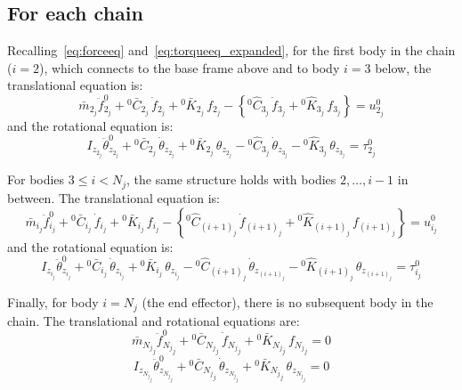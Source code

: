 \subsection{For each chain}

Recalling~\eqref{eq:forceeq} and~\eqref{eq:torqueeq_expanded}, for the first body in the chain ($i=2$), which connects to the base frame above and to body $i=3$ below, the translational equation is:
\begin{equation}
        \bar{m}_{2_j}
        \ddot{f}^{0}_{2_j}
        + {}^0\bar{C}_{2_j}\,\dot{f}_{2_j}
        + {}^0\bar{K}_{2_j}\,f_{2_j}
        - \left\{
            {}^0\hat{C}_{3_j}\,\dot{f}_{3_j} + {}^0\hat{K}_{3_j}\,f_{3_j}
        \right\}
        = u^0_{2_j}
\end{equation}
and the rotational equation is:
\begin{equation}
        I_{z_{2_j}}\ddot{\theta}^{0}_{z_{2_j}}
        + {}^0\bar{C}_{2_j}\,\dot{\theta}_{z_{2_j}}
        + {}^0\bar{K}_{2_j}\,\theta_{z_{2_j}}
        - {}^0\hat{C}_{3_j}\,\dot{\theta}_{z_{3_j}}
        - {}^0\hat{K}_{3_j}\,\theta_{z_{3_j}}
        = \tau^0_{2_j}
\end{equation}

For bodies $3\leq i< N_j$, the same structure holds with bodies $2, \dots, i-1$ in between. The translational equation is:
\begin{equation}
        \bar{m}_{i_j}
        \ddot{f}^{0}_{i_j}
        + {}^0\bar{C}_{i_j}\,\dot{f}_{i_j}
        + {}^0\bar{K}_{i_j}\,f_{i_j}
        -
        \left\{
            {}^0\hat{C}_{(i+1)_j}\,\dot{f}_{(i+1)_j} + {}^0\hat{K}_{(i+1)_j}\,f_{(i+1)_j}
        \right\}
        = u^0_{i_j}
\end{equation}
and the rotational equation is:
\begin{equation}
        I_{z_{i_j}}\ddot{\theta}^{0}_{z_{i_j}}
        + {}^0\bar{C}_{i_j}\,\dot{\theta}_{z_{i_j}}
        + {}^0\bar{K}_{i_j}\,\theta_{z_{i_j}}
        - {}^0\hat{C}_{(i+1)_j}\,\dot{\theta}_{z_{(i+1)_j}}
        - {}^0\hat{K}_{(i+1)_j}\,\theta_{z_{(i+1)_j}}
        = \tau^0_{i_j}
\end{equation}

Finally, for body $i = N_j$ (the end effector), there is no subsequent body in the chain. The translational and rotational equations are:
\begin{equation}
        \bar{m}_{{N_j}_j}
        \ddot{f}^{0}_{{N_j}_j}
        + {}^0\bar{C}_{{N_j}_j}\,\dot{f}_{{N_j}_j}
        + {}^0\bar{K}_{{N_j}_j}\,f_{{N_j}_j}
        = 0
\end{equation}
\begin{equation}
        I_{z_{{N_j}_j}}\ddot{\theta}^{0}_{z_{{N_j}_j}}
        + {}^0\bar{C}_{{N_j}_j}\,\dot{\theta}_{z_{{N_j}_j}}
        + {}^0\bar{K}_{{N_j}_j}\,\theta_{z_{{N_j}_j}}
        = 0
\end{equation}

